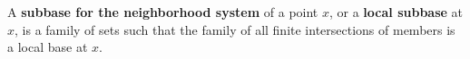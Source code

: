 A \textbf{subbase for the neighborhood system} of a point $x$, or a \textbf{local subbase} at $x$, is a family of sets such that the family of all finite intersections of members is a local base at $x$.

